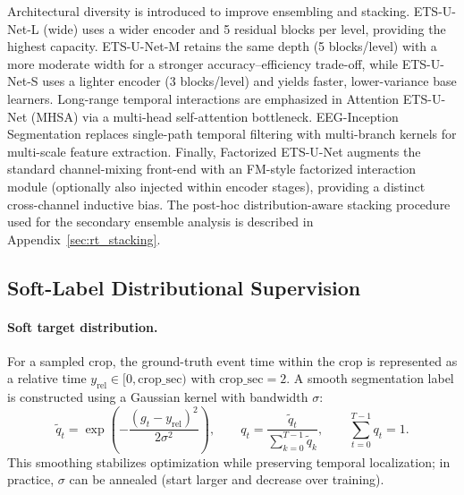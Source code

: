 \documentclass[12pt]{article}
\begin{document}
Architectural diversity is introduced to improve ensembling and stacking. ETS-U-Net-L (wide) uses a wider encoder and
5 residual blocks per level, providing the highest capacity. ETS-U-Net-M retains the same depth (5 blocks/level) with a
more moderate width for a stronger accuracy--efficiency trade-off, while ETS-U-Net-S uses a lighter encoder
(3 blocks/level) and yields faster, lower-variance base learners. Long-range temporal interactions are emphasized in
Attention ETS-U-Net (MHSA) via a multi-head self-attention bottleneck. EEG-Inception Segmentation replaces single-path temporal filtering
with multi-branch kernels for multi-scale feature extraction. Finally, Factorized ETS-U-Net augments the standard channel-mixing
front-end with an FM-style factorized interaction module (optionally also injected within encoder stages), providing a
distinct cross-channel inductive bias. The post-hoc distribution-aware stacking procedure used for the secondary ensemble analysis is described in Appendix~\ref{sec:rt_stacking}.

\subsection{Soft-Label Distributional Supervision}

\paragraph{Soft target distribution.}
For a sampled crop, the ground-truth event time within the crop is represented as a relative time
$y_{\mathrm{rel}}\in[0,\mathrm{crop\_sec})$ with $\mathrm{crop\_sec}=2$.
A smooth segmentation label is constructed using a Gaussian kernel with bandwidth $\sigma$:
\begin{equation}
\label{eq:rt_soft_target}
\tilde q_t=\exp\left(-\frac{(g_t-y_{\mathrm{rel}})^2}{2\sigma^2}\right),\qquad
q_t=\frac{\tilde q_t}{\sum_{k=0}^{T-1}\tilde q_k},\qquad
\sum_{t=0}^{T-1} q_t=1.
\end{equation}
This smoothing stabilizes optimization while preserving temporal localization; in practice, $\sigma$ can be annealed
(start larger and decrease over training).
\end{document}
